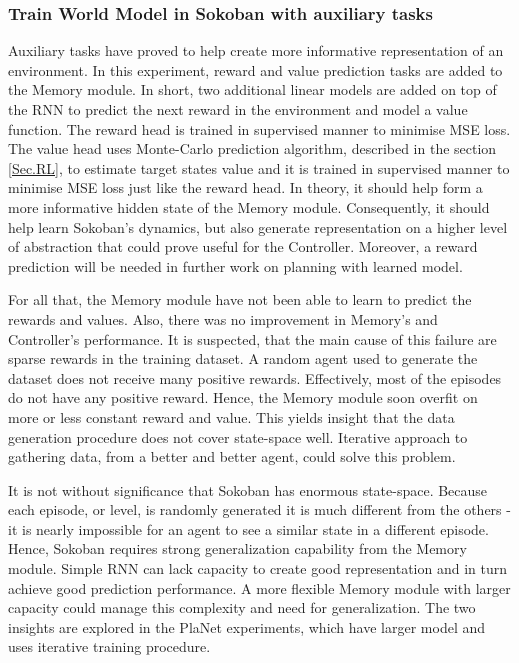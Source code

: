 \subsubsection{Train World Model in Sokoban with auxiliary tasks}

Auxiliary tasks \cite{Algo.AuxiliaryTasks} have proved to help create more informative representation of an environment. In this experiment, reward and value prediction tasks are added to the Memory module. In short, two additional linear models are added on top of the RNN to predict the next reward in the environment and model a value function. The reward head is trained in supervised manner to minimise MSE loss. The value head uses Monte-Carlo prediction algorithm, described in the section \ref{Sec.RL}, to estimate target states value and it is trained in supervised manner to minimise MSE loss just like the reward head. In theory, it should help form a more informative hidden state of the Memory module. Consequently, it should help learn Sokoban’s dynamics, but also generate representation on a higher level of abstraction that could prove useful for the Controller. Moreover, a reward prediction will be needed in further work on planning with learned model.

For all that, the Memory module have not been able to learn to predict the rewards and values. Also, there was no improvement in Memory's and Controller’s performance. It is suspected, that the main cause of this failure are sparse rewards in the training dataset. A random agent used to generate the dataset does not receive many positive rewards. Effectively, most of the episodes do not have any positive reward. Hence, the Memory module soon overfit on more or less constant reward and value. 
This yields insight that the data generation procedure does not cover state-space well. Iterative approach to gathering data, from a better and better agent, could solve this problem.

It is not without significance that Sokoban has enormous state-space. Because each episode, or level, is randomly generated it is much different from the others - it is nearly impossible for an agent to see a similar state in a different episode. Hence, Sokoban requires strong generalization capability from the Memory module. Simple RNN can lack capacity to create good representation and in turn achieve good prediction performance. A more flexible Memory module with larger capacity could manage this complexity and need for generalization. The two insights are explored in the PlaNet experiments, which have larger model and uses iterative training procedure.

